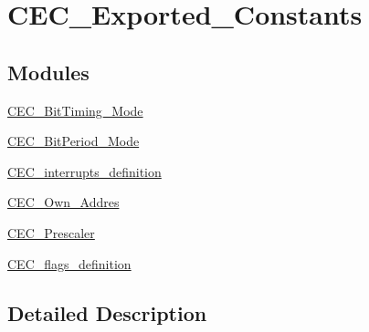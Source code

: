 \hypertarget{group___c_e_c___exported___constants}{\section{C\-E\-C\-\_\-\-Exported\-\_\-\-Constants}
\label{group___c_e_c___exported___constants}
}
\subsection*{Modules}
\begin{DoxyCompactItemize}
\item 
\hyperlink{group___c_e_c___bit_timing___mode}{C\-E\-C\-\_\-\-Bit\-Timing\-\_\-\-Mode}
\item 
\hyperlink{group___c_e_c___bit_period___mode}{C\-E\-C\-\_\-\-Bit\-Period\-\_\-\-Mode}
\item 
\hyperlink{group___c_e_c__interrupts__definition}{C\-E\-C\-\_\-interrupts\-\_\-definition}
\item 
\hyperlink{group___c_e_c___own___addres}{C\-E\-C\-\_\-\-Own\-\_\-\-Addres}
\item 
\hyperlink{group___c_e_c___prescaler}{C\-E\-C\-\_\-\-Prescaler}
\item 
\hyperlink{group___c_e_c__flags__definition}{C\-E\-C\-\_\-flags\-\_\-definition}
\end{DoxyCompactItemize}


\subsection{Detailed Description}
